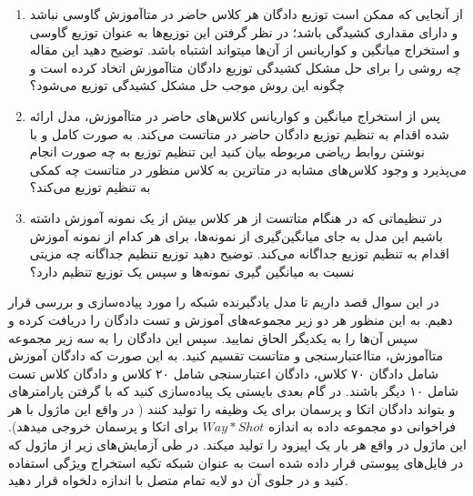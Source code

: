 \documentclass{article}
\begin{document}
\begin{enumerate}

\item
از آنجایی که ممکن است توزیع دادگان هر کلاس حاضر در متاآموزش گاوسی نباشد و دارای مقداری کشیدگی باشد؛ در نظر گرفتن این توزیع‌ها به عنوان توزیع گاوسی و استخراج میانگین و کواریانس از آن‌ها میتواند اشتباه باشد. توضیح دهید این مقاله چه روشی را برای حل مشکل کشیدگی توزیع دادگان متاآموزش اتخاد کرده است و چگونه این روش موجب حل مشکل کشیدگی توزیع می‌شود؟

\item
پس از استخراج میانگین و کواریانس کلاس‌های حاضر در متاآموزش، مدل ارائه شده اقدام به تنظیم توزیع دادگان حاضر در متاتست می‌کند. به صورت کامل و با نوشتن روابط ریاضی مربوطه بیان کنید این تنظیم توزیع به چه صورت انجام می‌پذیرد و وجود کلاس‌های مشابه در متاترین به کلاس منظور در متاتست چه کمکی به تنظیم توزیع می‌کند؟

\item
در تنظیماتی که در هنگام متاتست از هر کلاس بیش از یک نمونه آموزش داشته باشیم این مدل به جای میانگین‌گیری از نمونه‌ها، برای هر کدام از 
نمونه آموزش اقدام به تنظیم توزیع جداگانه می‌کند. توضیح دهید توزیع تنظیم جداگانه چه مزیتی نسبت به میانگین گیری نمونه‌ها و سپس یک توزیع تنظیم دارد؟

\end{enumerate}




در این سوال قصد داریم تا مدل یادگیرنده
شبکه
\href{https://arxiv.org/abs/1703.05175}{}
را مورد پیاده‌سازی و بررسی قرار دهیم. به این منظور هر دو زیر مجموعه‌های آموزش و تست دادگان
را دریافت کرده و سپس آن‌ها را به یکدیگر الحاق نمایید. 
سپس این دادگان را به سه زیر مجموعه
متاآموزش، متااعتبارسنجی و متاتست تقسیم کنید. به این صورت که دادگان آموزش شامل دادگان ۷۰ کلاس، دادگان اعتبارسنجی شامل ۲۰ کلاس و دادگان  کلاس تست شامل ۱۰ دیگر باشند.
در گام بعدی بایستی یک 
پیاده‌سازی کنید که با گرفتن پارامترهای
و
بتواند دادگان
اتکا و پرسمان برای یک وظیفه را تولید کنند ( در واقع این ماژول با هر فراخوانی دو مجموعه داده به اندازه
$Way * Shot$
برای اتکا و پرسمان خروجی میدهد). این ماژول در واقع هر بار یک اپیزود را تولید میکند.
در طی آزمایش‌های زیر از ماژول
که در فایل‌های پیوستی قرار داده شده است به عنوان شبکه  تکیه استخراج ویژگی استفاده کنید و در جلوی آن دو لایه تمام متصل با اندازه دلخواه قرار دهید.
\end{document}
